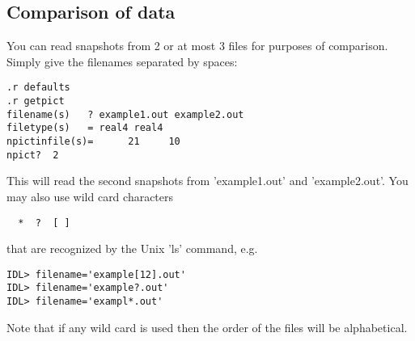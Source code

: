 \subsection{Comparison of data \label{s-compare}}

   You can read snapshots from 2 or at most 3 files for purposes of
   comparison. Simply give the filenames separated by spaces:
\begin{verbatim}
.r defaults
.r getpict
filename(s)   ? example1.out example2.out
filetype(s)   = real4 real4
npictinfile(s)=      21     10
npict?  2
\end{verbatim}
   This will read the second snapshots from 'example1.out' and
   'example2.out'. You may also use wild card characters 
\begin{verbatim}
  *  ?  [ ]
\end{verbatim}
    that are recognized by the Unix 'ls' command, e.g.
\begin{verbatim}
IDL> filename='example[12].out'
IDL> filename='example?.out'
IDL> filename='exampl*.out'
\end{verbatim}
   Note that if any wild card is used then the order of the files will 
   be alphabetical.

